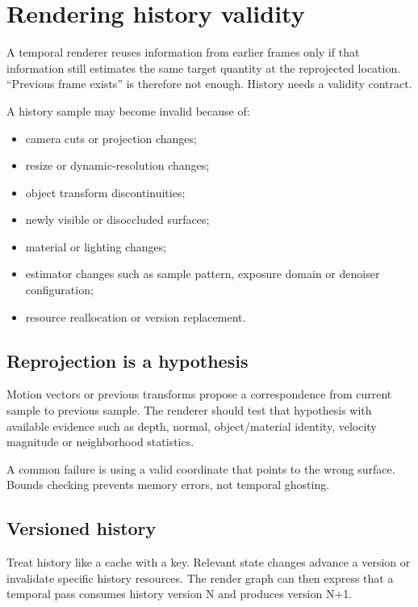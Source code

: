 \hypertarget{appendix-2e7e9fd28a2c}{}
\section{Rendering history validity}\label{appendix-2e7e9fd28a2c-rendering-history-validity}

A temporal renderer reuses information from earlier frames only if that information still estimates the same target quantity at the reprojected location. ``Previous frame exists'' is therefore not enough. History needs a validity contract.

A history sample may become invalid because of:

\begin{itemize}
\tightlist
\item
  camera cuts or projection changes;
\item
  resize or dynamic-resolution changes;
\item
  object transform discontinuities;
\item
  newly visible or disoccluded surfaces;
\item
  material or lighting changes;
\item
  estimator changes such as sample pattern, exposure domain or denoiser configuration;
\item
  resource reallocation or version replacement.
\end{itemize}

\subsection{Reprojection is a hypothesis}\label{appendix-2e7e9fd28a2c-reprojection-is-a-hypothesis}

Motion vectors or previous transforms propose a correspondence from current sample to previous sample. The renderer should test that hypothesis with available evidence such as depth, normal, object/material identity, velocity magnitude or neighborhood statistics.

A common failure is using a valid coordinate that points to the wrong surface. Bounds checking prevents memory errors, not temporal ghosting.

\subsection{Versioned history}\label{appendix-2e7e9fd28a2c-versioned-history}

Treat history like a cache with a key. Relevant state changes advance a version or invalidate specific history resources. The render graph can then express that a temporal pass consumes history version N and produces version N+1.

